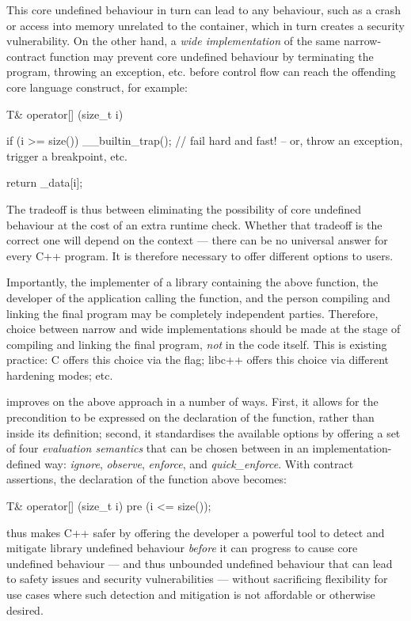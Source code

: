 This core undefined behaviour in turn can lead to any behaviour, such as a crash or access into memory unrelated to the container, which in turn creates a security vulnerability. On the other hand, a \emph{wide implementation} of the same narrow-contract function may prevent core undefined behaviour by terminating the program, throwing an exception, etc. before control flow can reach the offending core language construct, for example:
\begin{codeblock}
T& operator[] (size_t i) {
  if (i >= size())
    __builtin_trap(); // fail hard and fast! -- or, throw an exception, trigger a breakpoint, etc.
    
  return _data[i];
}
\end{codeblock}
The tradeoff is thus between eliminating the possibility of core undefined behaviour at the cost of an extra runtime check. Whether that tradeoff is the correct one will depend on the context --- there can be no universal answer for every C++ program. It is therefore necessary to offer different options to users.

Importantly, the implementer of a library containing the above function, the developer of the application calling the function, and the person compiling and linking the final program may be completely independent parties. Therefore, choice between narrow and wide implementations should be made at the stage of compiling and linking the final program, \emph{not} in the code itself. This is existing practice: C  offers this choice via the  flag; libc++ offers this choice via different hardening modes; etc.

\cite{P2900R9} improves on the above approach in a number of ways. First, it allows for the precondition to be expressed on the declaration of the function, rather than inside its definition; second, it standardises the available options by offering a set of four \emph{evaluation semantics} that can be chosen between in an implementation-defined way: \emph{ignore}, \emph{observe}, \emph{enforce}, and \emph{quick_enforce}. With \cite{P2900R9} contract assertions, the declaration of the function above becomes:
\begin{codeblock}
T& operator[] (size_t i)
pre (i <= size());
\end{codeblock}
\cite{P2900R9} thus makes C++ safer by offering the developer a powerful tool to detect and mitigate library undefined behaviour \emph{before} it can progress to cause core undefined behaviour --- and thus unbounded undefined behaviour that can lead to safety issues and security vulnerabilities --- without sacrificing flexibility for use cases where such detection and mitigation is not affordable or otherwise desired.

